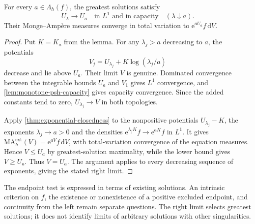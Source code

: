 \begin{proposition}\label{prop:greatest-exponential-right-continuity}
For every $a\in\Lambda_h(f)$, the greatest solutions satisfy
\[
 U_\lambda\longrightarrow U_a
       \quad\text{in }L^1\text{ and in capacity}\quad(\lambda\downarrow a).
\]
Their Monge--Amp\`ere measures converge in total variation to $\mathrm e^{aU_a}f\,\mathrm dV$.
\end{proposition}
\begin{proof}
Put $K=K_a$ from the lemma. For any $\lambda_j>a$ decreasing to $a$, the potentials
\[
 V_j=U_{\lambda_j}+K\log(\lambda_j/a)
\]
decrease and lie above $U_a$. Their limit $V$ is genuine. Dominated convergence between the integrable bounds $U_a$ and $V_1$ gives $L^1$ convergence, and \cref{lem:monotone-psh-capacity} gives capacity convergence. Since the added constants tend to zero, $U_{\lambda_j}\to V$ in both topologies.

Apply \cref{thm:exponential-closedness} to the nonpositive potentials $U_{\lambda_j}-K$, the exponents $\lambda_j\to a>0$ and the densities $\mathrm e^{\lambda_jK}f\to\mathrm e^{aK}f$ in $L^1$. It gives $\mathrm{MA}^{\mathrm{ext}}_h(V)=\mathrm e^{aV}f\,\mathrm dV$, with total-variation convergence of the equation measures. Hence $V\leq U_a$ by greatest-solution maximality, while the lower bound gives $V\geq U_a$. Thus $V=U_a$. The argument applies to every decreasing sequence of exponents, giving the stated right limit.
\end{proof}

The endpoint test is expressed in terms of existing solutions. An intrinsic criterion on $f$, the existence or nonexistence of a positive excluded endpoint, and continuity from the left remain separate questions. The right limit selects greatest solutions; it does not identify limits of arbitrary solutions with other singularities.
